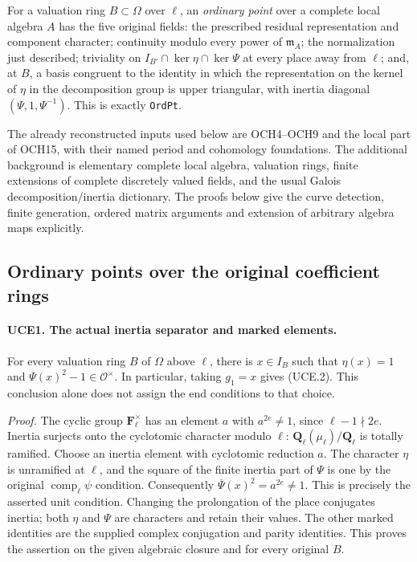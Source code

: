 For a valuation ring \(B\subset\Omega\) over \(\ell\), an
\emph{ordinary point} over a complete local algebra \(A\) has the
five original fields: the prescribed residual representation and
component character; continuity modulo every power of \(\mathfrak m_A\);
the normalization just described; triviality on
\(I_{B'}\cap\ker\eta\cap\ker\Psi\) at every place away from
\(\ell\); and, at \(B\), a basis congruent to the identity in which
the representation on the kernel of \(\eta\) in the decomposition
group is upper triangular, with inertia diagonal
\((\Psi,1,\Psi^{-1})\).  This is exactly \texttt{OrdPt}.

The already reconstructed inputs used below are OCH4--OCH9 and the
local part of OCH15, with their named period and cohomology foundations.
The additional background is elementary complete local algebra,
valuation rings, finite extensions of complete discretely valued
fields, and the usual Galois decomposition/inertia dictionary.  The
proofs below give the curve detection, finite generation, ordered
matrix arguments and extension of arbitrary algebra maps explicitly.

\subsection{Ordinary points over the original coefficient rings}

\paragraph{UCE1. The actual inertia separator and marked elements.}
\label{claim:UCE1}
For every valuation ring \(B\) of \(\Omega\) above \(\ell\), there is
\(x\in I_B\) such that
\(\eta(x)=1\) and \(\Psi(x)^2-1\in\mathcal O^\times\).
In particular, taking \(g_1=x\) gives (UCE.2).  This conclusion alone
does not assign the end conditions to that choice.

\emph{Proof.}
The cyclic group \(\mathbf F_\ell^\times\) has an element \(a\)
with \(a^{2e}\ne1\), since \(\ell-1\nmid2e\).
Inertia surjects onto the cyclotomic character modulo \(\ell\):
\(\mathbf Q_\ell(\mu_\ell)/\mathbf Q_\ell\) is totally ramified.
Choose an inertia element with cyclotomic reduction \(a\).
The character \(\eta\) is unramified at \(\ell\), and the square
of the finite inertia part of \(\Psi\) is one by the original
\(\operatorname{comp}_\ell\psi\) condition.  Consequently
\(\overline\Psi(x)^2=a^{2e}\ne1\).  This is precisely the asserted
unit condition.  Changing the prolongation of the place conjugates
inertia; both \(\eta\) and \(\Psi\) are characters and retain their
values.  The other marked identities are the supplied complex
conjugation and parity identities.  This proves the assertion on the
given algebraic closure and for every original \(B\).

